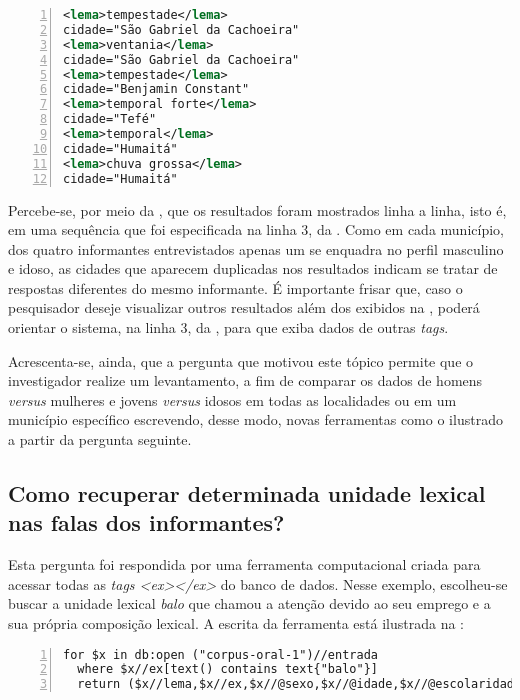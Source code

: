 \documentclass[portuguese]{textolivre}
\begin{document}
\begin{lstlisting}[language=XML, label=tab07, caption={Resultados das instruções escritas na \Cref{tab06}}, source={Elaboração do autor.}, numbers=left]
<lema>tempestade</lema>
cidade="São Gabriel da Cachoeira"
<lema>ventania</lema>
cidade="São Gabriel da Cachoeira"
<lema>tempestade</lema>
cidade="Benjamin Constant"
<lema>temporal forte</lema>
cidade="Tefé"
<lema>temporal</lema>
cidade="Humaitá"
<lema>chuva grossa</lema>
cidade="Humaitá"
\end{lstlisting} %

Percebe-se, por meio da , que os resultados foram mostrados linha a linha, isto é, em uma sequência que foi especificada na linha 3, da . Como em cada município, dos quatro informantes entrevistados apenas um se enquadra no perfil masculino e idoso, as cidades que aparecem duplicadas nos resultados indicam se tratar de respostas diferentes do mesmo informante. É importante frisar que, caso o pesquisador deseje visualizar outros resultados além dos exibidos na , poderá orientar o sistema, na linha 3, da , para que exiba dados de outras \emph{tags}.

Acrescenta-se, ainda, que a pergunta que motivou este tópico permite que o investigador realize um levantamento, a fim de comparar os dados de homens \emph{versus} mulheres e jovens \emph{versus} idosos em todas as localidades ou em um município específico escrevendo, desse modo, novas ferramentas como o ilustrado a partir da pergunta seguinte.

\subsection{Como recuperar determinada unidade lexical nas falas dos informantes?}

Esta pergunta foi respondida por uma ferramenta computacional criada para acessar todas as \emph{tags <ex></ex>} do banco de dados. Nesse exemplo, escolheu-se buscar a unidade lexical \textit{balo} que chamou a atenção devido ao seu emprego e a sua própria composição lexical. A escrita da ferramenta está ilustrada na :

\begin{lstlisting}[language=XQuery, label=tab08, caption={Instruções para a recuperação de dados a partir de uma unidade lexical.}, source={Elaboração do autor.}, numbers=left]
for $x in db:open ("corpus-oral-1")//entrada
  where $x//ex[text() contains text{"balo"}]  
  return ($x//lema,$x//ex,$x//@sexo,$x//@idade,$x//@escolaridade,$x//@cidade,$x//@estado)
\end{lstlisting} %
\end{document}

